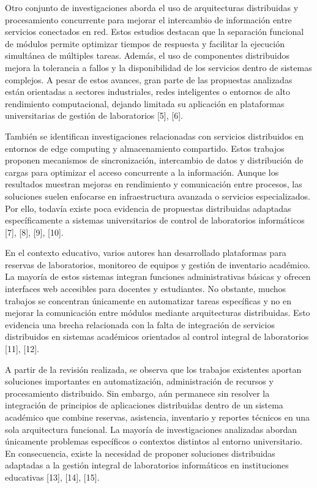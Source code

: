 \documentclass[12pt,a4paper]{article}
\begin{document}
\vspace{0.2cm}

Otro conjunto de investigaciones aborda el uso de arquitecturas distribuidas y procesamiento concurrente para mejorar el intercambio de información entre servicios conectados en red. Estos estudios destacan que la separación funcional de módulos permite optimizar tiempos de respuesta y facilitar la ejecución simultánea de múltiples tareas. Además, el uso de componentes distribuidos mejora la tolerancia a fallos y la disponibilidad de los servicios dentro de sistemas complejos. A pesar de estos avances, gran parte de las propuestas analizadas están orientadas a sectores industriales, redes inteligentes o entornos de alto rendimiento computacional, dejando limitada su aplicación en plataformas universitarias de gestión de laboratorios [5], [6].

\vspace{0.2cm}

También se identifican investigaciones relacionadas con servicios distribuidos en entornos de edge computing y almacenamiento compartido. Estos trabajos proponen mecanismos de sincronización, intercambio de datos y distribución de cargas para optimizar el acceso concurrente a la información. Aunque los resultados muestran mejoras en rendimiento y comunicación entre procesos, las soluciones suelen enfocarse en infraestructura avanzada o servicios especializados. Por ello, todavía existe poca evidencia de propuestas distribuidas adaptadas específicamente a sistemas universitarios de control de laboratorios informáticos [7], [8], [9], [10].

\vspace{0.2cm}

En el contexto educativo, varios autores han desarrollado plataformas para reservas de laboratorios, monitoreo de equipos y gestión de inventario académico. La mayoría de estos sistemas integran funciones administrativas básicas y ofrecen interfaces web accesibles para docentes y estudiantes. No obstante, muchos trabajos se concentran únicamente en automatizar tareas específicas y no en mejorar la comunicación entre módulos mediante arquitecturas distribuidas. Esto evidencia una brecha relacionada con la falta de integración de servicios distribuidos en sistemas académicos orientados al control integral de laboratorios [11], [12].

\vspace{0.2cm}

A partir de la revisión realizada, se observa que los trabajos existentes aportan soluciones importantes en automatización, administración de recursos y procesamiento distribuido. Sin embargo, aún permanece sin resolver la integración de principios de aplicaciones distribuidas dentro de un sistema académico que combine reservas, asistencia, inventario y reportes técnicos en una sola arquitectura funcional. La mayoría de investigaciones analizadas abordan únicamente problemas específicos o contextos distintos al entorno universitario. En consecuencia, existe la necesidad de proponer soluciones distribuidas adaptadas a la gestión integral de laboratorios informáticos en instituciones educativas [13], [14], [15].
\end{document}
